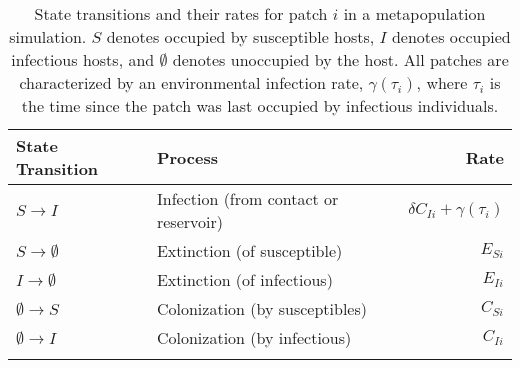 \documentclass{article}
\begin{document}
\clearpage

\begin{table}
\caption{State transitions and their rates for patch $i$ in a metapopulation simulation.  $S$ denotes occupied by  susceptible hosts, $I$ denotes occupied infectious hosts, and $\emptyset$ denotes unoccupied by the host.  All patches are characterized by an environmental infection rate, $\gamma(\tau_i)$, where $\tau_i$ is the time since the patch was last occupied by infectious individuals.}
\begin{tabular}{llr}
State Transition & Process &  Rate \\
\hline
$S \rightarrow I$ & Infection (from contact or reservoir) & $\delta C_{Ii} + \gamma(\tau_i)$\\
$S \rightarrow \emptyset $ & Extinction (of susceptible) & $E_{Si}$\\
$I \rightarrow \emptyset $ & Extinction (of infectious) &  $E_{Ii}$ \\
$\emptyset \rightarrow S$ & Colonization (by susceptibles) & $C_{Si}$\\
$\emptyset \rightarrow I$ & Colonization (by infectious) & $C_{Ii}$\\
\label{transitions}
\end{tabular}
\end{table}

\end{document}
